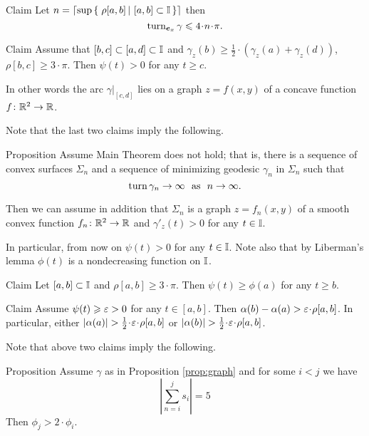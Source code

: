 \documentclass[a4paper,10pt]{amsart}
\begin{document}
\begin{thm}{Claim}\label{clm:rotations}
Let $n=\lceil \sup\set{\rho[a,b]}{[a,b]\subset\II} \rceil$
then \[\turn_{\bm{e}_x}\gamma\le 4\cdot n\cdot\pi.\]

\end{thm}


\begin{thm}{Claim}
Assume that $[b,c]\subset [a,d]\subset \mathbb{I}$ and
$\gamma_z(b)
\ge
\tfrac12\cdot(\gamma_z(a)+\gamma_z(d))$,
$\rho[b,c]\ge 3\cdot \pi$.
Then $\psi(t)>0$ for any $t\ge c$.

In other words the arc $\gamma|_{[c,d]}$ lies on a graph $z=f(x,y)$ of a concave function $f\colon\mathbb{R}^2\to\mathbb{R}$.
\end{thm}

Note that the last two claims imply the following.

\begin{thm}{Proposition}\label{prop:graph}
Assume Main Theorem does not hold;
that is, there is a sequence of convex surfaces $\Sigma_n$
and a sequence of minimizing geodesic $\gamma_n$ in $\Sigma_n$ such that 
\[\turn \gamma_n\to\infty\ \ \text{as}\ \ n\to\infty.\]

Then we can assume in addition that $\Sigma_n$ is a graph $z=f_n(x,y)$ of a smooth convex function $f_n\colon\mathbb{R}^2\to\mathbb{R}$
and $\gamma'_z(t)>0$ for any $t\in\mathbb{I}$. 
\end{thm}

In particular, from now on $\psi(t)>0$ for any $t\in\mathbb{I}$.
Note also that by Liberman's lemma $\phi(t)$ is a nondecreasing function on $\mathbb{I}$.

\begin{thm}{Claim}
Let $[a,b]\subset\mathbb{I}$ and $\rho[a,b]\ge 3\cdot\pi$.
Then $\psi(t)\ge \phi(a)$ for any $t\ge b$.
\end{thm}


\begin{thm}{Claim}
Assume  
$\psi(t)\geqslant \varepsilon>0$ for any $t\in [a,b]$.
Then 
$\alpha(b)-\alpha(a)>\eps\cdot\rho[a,b]$.
In particular, either $|\alpha(a)|>\tfrac12\cdot\eps\cdot\rho[a,b]$ or $|\alpha(b)|>\tfrac12\cdot\eps\cdot\rho[a,b]$.
\end{thm}

Note that above two claims imply the following.

\begin{thm}{Proposition}
Assume $\gamma$ as in Proposition \ref{prop:graph}
and for some $i<j$ we have
\[\left|\sum_{n=i}^js_i\right|=5\]
Then $\phi_j>2\cdot\phi_i$.
\end{thm}
\end{document}
